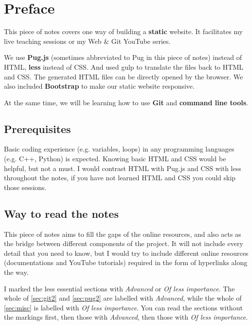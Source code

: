 \chapter*{Preface}

This piece of notes covers one way of building a \textbf{static} website. It facilitates my live teaching sessions or my Web \& Git YouTube series.
\vspace{6mm}

We use \textbf{Pug.js} (sometimes abbreviated to Pug in this piece of notes) instead of HTML, \textbf{less} instead of CSS. And used gulp to translate the files back to HTML and CSS. The generated HTML files can be directly opened by the browser. We also included \textbf{Bootstrap} to make our static website responsive.
\vspace{6mm}

At the same time, we will be learning how to use \textbf{Git} and \textbf{command line tools}.

\section{Prerequisites}

Basic coding experience (e.g. variables, loops) in any programming languages (e.g. C++, Python) is expected. Knowing basic HTML and CSS would be helpful, but not a must. I would contrast HTML with Pug.js and CSS with less throughout the notes, if you have not learned HTML and CSS you could skip those sessions.

\section{Way to read the notes}

This piece of notes aims to fill the gaps of the online resources, and also acts as the bridge between different components of the project. It will not include every detail that you need to know, but I would try to include different online resources (documentations and YouTube tutorials) required in the form of hyperlinks along the way.

\vspace{6mm}

I marked the less essential sections with \textit{Advanced} or \textit{Of less importance}. The whole of \cref{sec:git2} and \cref{sec:pug2} are labelled with \textit{Advanced}, while the whole of \cref{sec:misc} is labelled with \textit{Of less importance}. You can read the sections without the markings first, then those with \textit{Advanced}, then those with \textit{Of less importance}.

